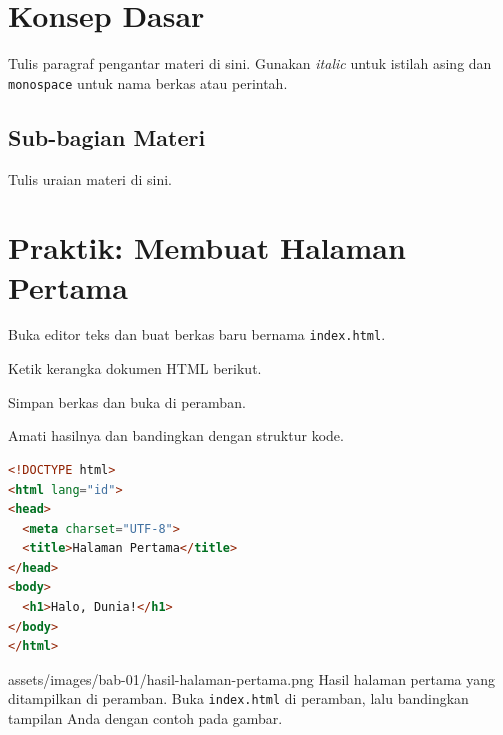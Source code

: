 \section{Konsep Dasar}
\label{sec:konsep-dasar}

Tulis paragraf pengantar materi di sini. Gunakan \emph{italic} untuk istilah
asing dan \texttt{monospace} untuk nama berkas atau perintah.

\subsection{Sub-bagian Materi}
\label{subsec:sub-bagian}

Tulis uraian materi di sini.

\section{Praktik: Membuat Halaman Pertama}
\label{sec:praktik-pertama}

\begin{langkah}
  \item Buka editor teks dan buat berkas baru bernama \texttt{index.html}.
  \item Ketik kerangka dokumen HTML berikut.
  \item Simpan berkas dan buka di peramban.
  \item Amati hasilnya dan bandingkan dengan struktur kode.
\end{langkah}

\begin{lstlisting}[language=HTML, caption={Struktur dasar HTML}, label={lst:html-dasar}]
<!DOCTYPE html>
<html lang="id">
<head>
  <meta charset="UTF-8">
  <title>Halaman Pertama</title>
</head>
<body>
  <h1>Halo, Dunia!</h1>
</body>
</html>
\end{lstlisting}

\begin{tangkapanlayar}
  {assets/images/bab-01/hasil-halaman-pertama.png}
  {Hasil halaman pertama yang ditampilkan di peramban.}
  {Buka \texttt{index.html} di peramban, lalu bandingkan tampilan Anda
   dengan contoh pada gambar.}
\end{tangkapanlayar}

